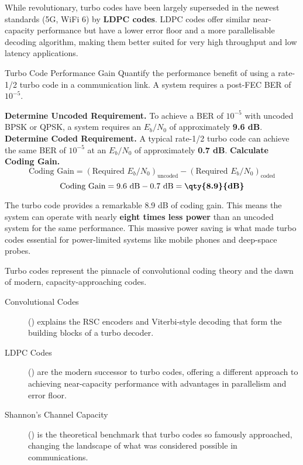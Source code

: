 \begin{warningbox}
    While revolutionary, turbo codes have been largely superseded in the newest standards (5G, WiFi 6) by \textbf{LDPC codes}. LDPC codes offer similar near-capacity performance but have a lower error floor and a more parallelisable decoding algorithm, making them better suited for very high throughput and low latency applications.
\end{warningbox}

\begin{workedexample}{Turbo Code Performance Gain}
     Quantify the performance benefit of using a rate-1/2 turbo code in a communication link.
     A system requires a post-FEC BER of $10^{-5}$.
    \begin{derivationsteps}
        \step \textbf{Determine Uncoded Requirement.} To achieve a BER of $10^{-5}$ with uncoded BPSK or QPSK, a system requires an $E_b/N_0$ of approximately \textbf{9.6 dB}.
        \step \textbf{Determine Coded Requirement.} A typical rate-1/2 turbo code can achieve the same BER of $10^{-5}$ at an $E_b/N_0$ of approximately \textbf{0.7 dB}.
        \step \textbf{Calculate Coding Gain.}
        \[ \text{Coding Gain} = (\text{Required } E_b/N_0)_{\text{uncoded}} - (\text{Required } E_b/N_0)_{\text{coded}} \]
        \[ \text{Coding Gain} = 9.6 \text{ dB} - 0.7 \text{ dB} = \textbf{\qty{8.9}{dB}} \]
    \end{derivationsteps}
     The turbo code provides a remarkable 8.9 dB of coding gain. This means the system can operate with nearly \textbf{eight times less power} than an uncoded system for the same performance. This massive power saving is what made turbo codes essential for power-limited systems like mobile phones and deep-space probes.
\end{workedexample}

\begin{importantbox}[title={Further Reading}]
    Turbo codes represent the pinnacle of convolutional coding theory and the dawn of modern, capacity-approaching codes.
    \begin{description}
        \item[Convolutional Codes] () explains the RSC encoders and Viterbi-style decoding that form the building blocks of a turbo decoder.
        \item[LDPC Codes] () are the modern successor to turbo codes, offering a different approach to achieving near-capacity performance with advantages in parallelism and error floor.
        \item[Shannon's Channel Capacity] () is the theoretical benchmark that turbo codes so famously approached, changing the landscape of what was considered possible in communications.
    \end{description}
\end{importantbox}